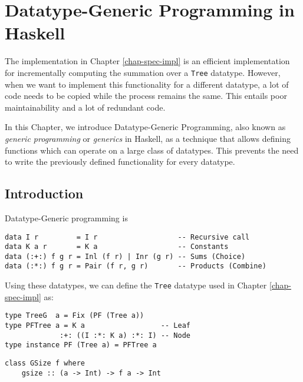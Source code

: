\chapter{Datatype-Generic Programming in Haskell}

The implementation in Chapter \ref{chap-spec-impl} is an efficient implementation for incrementally computing the summation over a \texttt{Tree} datatype. However, when we want to implement this functionality for a different datatype, a lot of code needs to be copied while the process remains the same. This entails poor maintainability and a lot of redundant code.


In this Chapter, we introduce Datatype-Generic Programming\cite*{gibbons2006datatype}, also known as \textit{generic programming} or \textit{generics} in Haskell, as a technique that allows defining functions which can operate on a large class of datatypes. This prevents the need to write the previously defined functionality for every datatype.

\section{Introduction}
Datatype-Generic programming is 


\begin{verbatim}
data I r         = I r                   -- Recursive call
data K a r       = K a                   -- Constants
data (:+:) f g r = Inl (f r) | Inr (g r) -- Sums (Choice)
data (:*:) f g r = Pair (f r, g r)       -- Products (Combine)
\end{verbatim}

Using these datatypes, we can define the \texttt{Tree} datatype used in Chapter \ref{chap-spec-impl} as:

\begin{verbatim}
type TreeG  a = Fix (PF (Tree a))
type PFTree a = K a                  -- Leaf
             :+: ((I :*: K a) :*: I) -- Node
type instance PF (Tree a) = PFTree a
\end{verbatim}

\begin{verbatim}
class GSize f where
    gsize :: (a -> Int) -> f a -> Int
\end{verbatim}

